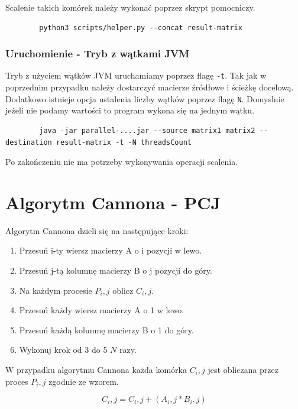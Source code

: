 \documentclass[11pt]{article}
\begin{document}
    Scalenie takich komórek należy wykonać poprzez skrypt pomocniczy.

    \begin{lstlisting}
        python3 scripts/helper.py --concat result-matrix
    \end{lstlisting}

    \subsubsection{Uruchomienie - Tryb z wątkami JVM}

    Tryb z użyciem wątków JVM uruchamiamy poprzez flagę \verb|-t|. Tak jak w poprzednim przypadku należy dostarczyć macierze źródłowe i ścieżkę docelową.
    Dodatkowo istnieje opcja ustalenia liczby wątków poprzez flagę \verb|N|. Domyslnie jeżeli nie podamy wartości to program wykona się na jednym wątku.
    \begin{lstlisting}
        java -jar parallel-....jar --source matrix1 matrix2 --destination result-matrix -t -N threadsCount
    \end{lstlisting}

    Po zakończeniu nie ma potrzeby wykonywania operacji scalenia.
    
    \section{Algorytm Cannona - PCJ}

    Algorytm Cannona dzieli się na następujące kroki:

    \begin{enumerate}
        \item Przesuń i-ty wiersz macierzy A o i pozycji w lewo.
        \item Przesuń j-tą kolumnę macierzy B o j pozycji do góry.
        \item Na każdym procesie $P_i,j$ oblicz $C_i,j$.
        \item Przesuń każdy wiersz macierzy A o 1 w lewo.
        \item Przesuń każdą kolumnę macierzy B o 1 do góry.
        \item Wykonuj krok od 3 do 5 $N$ razy.
    \end{enumerate}

    W przypadku algorytmu Cannona każda komórka $C_i,j$ jest obliczana przez proces $P_i,j$ zgodnie ze wzorem.

    \[C_i,j = C_i,j + (A_i,j * B_i,j)\]
\end{document}
